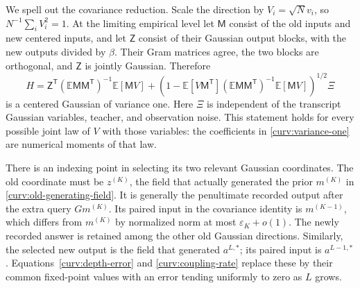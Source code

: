 \documentclass[11pt,reqno]{amsart}
\begin{document}
We spell out the covariance reduction. Scale the direction by
$V_i=\sqrt N v_i$, so $N^{-1}\sum_iV_i^2=1$. At the limiting empirical
level let $\mathsf M$ consist of the old inputs and new centered inputs,
and let $\mathsf Z$ consist of their Gaussian output blocks, with the
new outputs divided by $\beta$. Their Gram matrices agree, the two
blocks are orthogonal, and $\mathsf Z$ is jointly Gaussian. Therefore
\begin{equation}\label{curv:variance-one}
 H=\mathsf Z^{\mathsf T}
          (\mathbb E\mathsf M\mathsf M^{\mathsf T})^{-1}
                                      \mathbb E[\mathsf M V]
      +\left(1-\mathbb E[V\mathsf M^{\mathsf T}]
          (\mathbb E\mathsf M\mathsf M^{\mathsf T})^{-1}
                                      \mathbb E[\mathsf M V]\right)^{1/2}
                                                   \Xi
\end{equation}
is a centered Gaussian of variance one. Here $\Xi$ is independent of
the transcript Gaussian variables, teacher, and observation noise.
This statement holds for every possible joint law of $V$ with those
variables: the coefficients in \eqref{curv:variance-one} are numerical
moments of that law.

There is an indexing point in selecting its two relevant Gaussian
coordinates. The old coordinate must be $z^{(K)}$, the field that
actually generated the prior $m^{(K)}$ in
\eqref{curv:old-generating-field}. It is generally the penultimate
recorded output after the extra query $Gm^{(K)}$. Its paired input in
the covariance identity is $m^{(K-1)}$, which differs from $m^{(K)}$
by normalized norm at most $\varepsilon_K+o(1)$. The newly recorded
answer is retained among the other old Gaussian directions. Similarly,
the selected new output is the field that generated $a^{L,*}$; its paired
input is $a^{L-1,*}$. Equations~\eqref{curv:depth-error} and
\eqref{curv:coupling-rate} replace these by their common fixed-point
values with an error tending uniformly to zero as $L$ grows.
\end{document}
